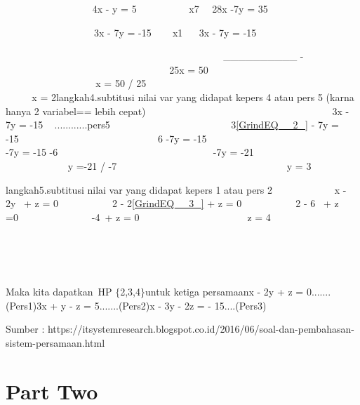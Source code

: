 \documentclass[11pt,fleqn]{book} %
\begin{document}
\noindent ~~~~~~~~~~~~~~~~~ 4x - y = 5~~~~~~~~~~ {\textbar}x7{\textbar}~~ 28x -7y = 35

\noindent ~~~~~~~~~~~~~~~~~~3x - 7y = -15 ~~~ {\textbar}x1{\textbar} ~~ 3x - 7y = -15

\noindent ~ ~ ~ ~ ~ ~ ~ ~ ~ ~ ~ ~ ~ ~ ~ ~ ~ ~ ~ ~ ~ ~ ~ ~ ~ ~~ \_\_\_\_\_\_\_\_\_\_ -~ ~ ~ ~ ~ ~ ~ ~ ~ ~ ~ ~ ~ ~ ~ ~ ~ ~ ~ ~ ~ ~ ~ ~ ~ ~ ~ 25x = 50~ ~ ~ ~ ~ ~ ~ ~ ~ ~ ~ ~ ~ ~ ~ ~ ~ ~ ~ ~ ~ ~ ~ ~ ~ ~ ~ ~ ~ x = 50 / 25~ ~ ~ ~ ~ ~ ~ ~ ~ ~ ~ ~ ~ ~ ~ ~ ~ ~ ~ ~ ~ ~ ~ ~ ~ ~ ~ ~ ~~x = 2langkah4.subtitusi nilai var yang didapat kepers 4 atau pers 5 (karna hanya 2 variabel== lebih cepat) ~ ~ ~~~~~~~~~ ~ ~ ~ ~ ~ ~~~~~~~~~~~~~~~~3x - 7y = -15 ~ ............pers5~ ~ ~ ~ ~ ~ ~~~ ~ ~ ~ ~ ~ ~~ 3\eqref{GrindEQ__2_} - 7y = -15~ ~ ~ ~ ~ ~ ~ ~ ~ ~ ~ ~ ~ ~ ~ ~ ~ 6 -7y = -15~ ~ ~ ~ ~ ~ ~ ~ ~ ~ ~ ~ ~ ~ ~ ~ ~ ~ ~ -7y = -15 -6~ ~ ~ ~ ~ ~ ~ ~ ~ ~ ~ ~ ~ ~ ~ ~ ~ ~ ~ -7y = -21~ ~ ~ ~ ~ ~ ~ ~ ~ ~ ~ ~ ~ ~ ~ ~ ~ ~ ~ ~~ y =-21 / -7~ ~ ~ ~ ~ ~ ~ ~ ~ ~ ~ ~ ~ ~ ~ ~ ~ ~ ~ ~~~y = 3~~

\noindent langkah5.subtitusi nilai var yang didapat kepers 1 atau pers 2~~ ~ ~ ~ ~ ~ ~ x - 2y ~+ z = 0~ ~ ~ ~ ~ ~~ 2 - 2\eqref{GrindEQ__3_} + z = 0~ ~ ~ ~ ~ ~~ 2 - 6 ~+ z =0~ ~ ~ ~ ~ ~ ~ ~ ~ -4~+ z = 0~ ~ ~ ~ ~ ~ ~ ~ ~ ~ ~ ~ ~~z = 4~~~~~~~~~~~~~ ~~~~~~~~~~~~~~~~~~~~~~~~~~~~~~~~~~~~

\noindent ~~ ~ ~ ~ ~ ~ ~ ~ ~ ~ ~ ~ ~ ~ ~ ~ ~ ~ ~ ~ ~ ~ ~ ~ ~ ~ ~ ~ ~ ~ ~ ~ ~ ~ ~ ~ ~ ~ ~ ~ ~ ~~ ~ ~ ~~

\noindent Maka kita dapatkan~HP $\{$2,3,4$\}$untuk ketiga persamaanx - 2y + z = 0.......(Pers1)3x + y - z = 5.......(Pers2)x - 3y - 2z = - 15....(Pers3)

\noindent Sumber : https://itsystemresearch.blogspot.co.id/2016/06/soal-dan-pembahasan-sistem-persamaan.html\textbf{}

\noindent 




\part{Part Two}

\end{document}
